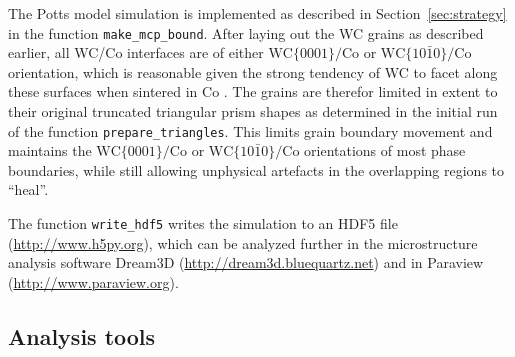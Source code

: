 \documentclass[3p,12pt]{elsarticle}
\begin{document}

The Potts model simulation is implemented as described in Section~\ref{sec:strategy} in the function \verb|make_mcp_bound|.
After laying out the WC grains as described earlier, all WC/Co interfaces are of either $\text{WC}\{0001\}/\text{Co}$ or $\text{WC}\{10\bar{1}0\}/\text{Co}$ orientation, which is reasonable given the strong tendency of WC to facet along these surfaces when sintered in Co \cite{kim_interface_2008}.
The grains are therefor limited in extent to their original truncated triangular prism shapes as determined in the initial run of the function \verb|prepare_triangles|.
This limits grain boundary movement and maintains the $\text{WC}\{0001\}/\text{Co}$ or $\text{WC}\{10\bar{1}0\}/\text{Co}$ orientations of most phase boundaries, while still allowing unphysical artefacts in the overlapping regions to ``heal''.
% 

The function \verb|write_hdf5| writes the simulation to an HDF5 file (\url{http://www.h5py.org}), which can be analyzed further in the microstructure analysis software Dream3D (\url{http://dream3d.bluequartz.net}) and in Paraview (\url{http://www.paraview.org}).


\subsection{Analysis tools} \label{sec:analysis_tools}
\end{document}
